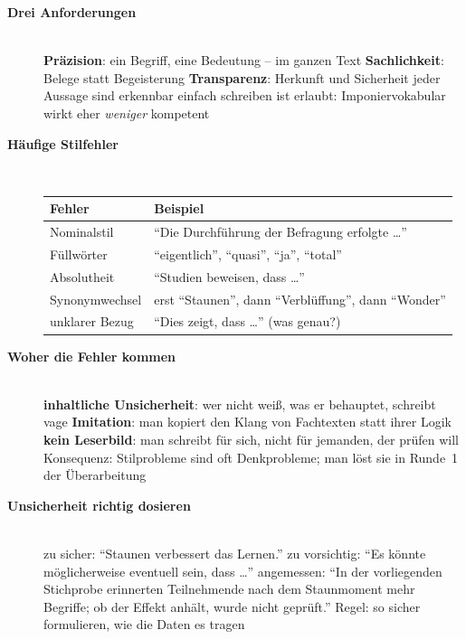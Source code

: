\begin{description}
\item[{\rot\bf Drei Anforderungen}]~\\[-\lblskip]
\bi
  \ite \textbf{Präzision}: ein Begriff, eine Bedeutung -- im ganzen Text
  \ite \textbf{Sachlichkeit}: Belege statt Begeisterung
  \ite \textbf{Transparenz}: Herkunft und Sicherheit jeder Aussage sind
    erkennbar
  \ite einfach schreiben ist erlaubt: Imponiervokabular wirkt eher
    \emph{weniger} kompetent \parencite{oppenheimer2006erudite}
\ei
\os{\newpage}

\item[{\rot\bf Häufige Stilfehler}]~\\[-\lblskip]
\begin{center}\nsl{\small}
\begin{tabular}{p{}p{}}
\toprule
\textbf{Fehler} & \textbf{Beispiel} \\
\midrule
Nominalstil & \enquote{Die Durchführung der Befragung erfolgte \ldots} \\
Füllwörter & \enquote{eigentlich}, \enquote{quasi}, \enquote{ja}, \enquote{total} \\
Absolutheit & \enquote{Studien beweisen, dass \ldots} \\
Synonymwechsel & erst \enquote{Staunen}, dann \enquote{Verblüffung}, dann \enquote{Wonder} \\
unklarer Bezug & \enquote{Dies zeigt, dass \ldots} (was genau?) \\
\bottomrule
\end{tabular}
\end{center}
\os{\newpage}

\item[{\rot\bf Woher die Fehler kommen}]~\\[-\lblskip]
\bi
  \ite \textbf{inhaltliche Unsicherheit}: wer nicht weiß, was er
    behauptet, schreibt vage
  \ite \textbf{Imitation}: man kopiert den Klang von Fachtexten statt
    ihrer Logik
  \ite \textbf{kein Leserbild}: man schreibt für sich, nicht für jemanden,
    der prüfen will
  \ite Konsequenz: Stilprobleme sind oft Denkprobleme; man löst sie in
    Runde~1 der Überarbeitung
\ei
\os{\newpage}

\item[{\rot\bf Unsicherheit richtig dosieren}]~\\[-\lblskip]
\bi
  \ite zu sicher: \enquote{Staunen verbessert das Lernen.}
  \ite zu vorsichtig: \enquote{Es könnte möglicherweise eventuell sein,
    dass \ldots}
  \ite angemessen: \enquote{In der vorliegenden Stichprobe erinnerten
    Teilnehmende nach dem Staunmoment mehr Begriffe; ob der Effekt
    anhält, wurde nicht geprüft.}
  \ite Regel: so sicher formulieren, wie die Daten es tragen
\ei
{}
\os{\newpage}
\end{description}

